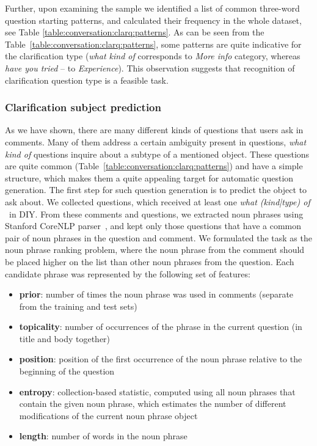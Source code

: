 Further, upon examining the sample we identified a list of common three-word question starting patterns, and calculated their frequency in the whole dataset, see Table \ref{table:conversation:clarq:patterns}. 
As can be seen from the Table~\ref{table:conversation:clarq:patterns}, some patterns are quite indicative for the clarification type (\eg \textit{what kind of} corresponds to \textit{More info} category, whereas \textit{have you tried} -- to \textit{Experience}).
This observation suggests that recognition of clarification question type is a feasible task.


\subsubsection{Clarification subject prediction}
\label{section:conversation:clarq:subj-prediction}

As we have shown, there are many different kinds of questions that users ask in comments.
Many of them address a certain ambiguity present in questions, \eg \textit{what kind of} questions inquire about a subtype of a mentioned object.
These questions are quite common (Table~\ref{table:conversation:clarq:patterns}) and have a simple structure, which makes them a quite appealing target for automatic question generation.
The first step for such question generation is to predict the object to ask about.
We collected questions, which received at least one \textit{what (kind|type) of} \clarQ~in DIY. 
From these comments and questions, we extracted noun phrases using Stanford CoreNLP parser~\cite{manning-EtAl:2014:P14-5}, and kept only those questions that have a common pair of noun phrases in the question and comment.
We formulated the task as the noun phrase ranking problem, where the noun phrase from the comment should be placed higher on the list than other noun phrases from the question.
Each candidate phrase was represented by the following set of features:
\begin{itemize}[noitemsep]
\item \textbf{prior}: number of times the noun phrase was used in comments (separate from the training and test sets)
\item \textbf{topicality}: number of occurrences of the phrase in the current question (in title and body together)
\item \textbf{position}: position of the first occurrence of the noun phrase relative to the beginning of the question
\item \textbf{entropy}: collection-based statistic, computed using all noun phrases that contain the given noun phrase, which estimates the number of different modifications of the current noun phrase object
\item \textbf{length}: number of words in the noun phrase
\end{itemize}

